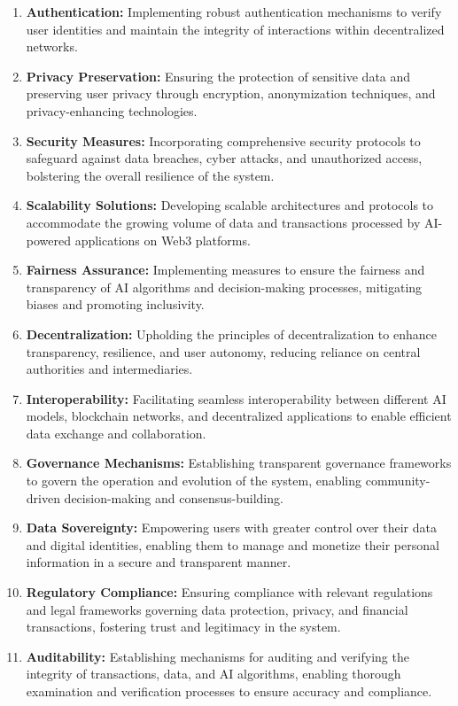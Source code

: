 \documentclass[conference]{IEEEtran}
\begin{document}
\begin{enumerate}
    \item \textbf{Authentication:} Implementing robust authentication mechanisms to verify user identities and maintain the integrity of interactions within decentralized networks.
\item \textbf{Privacy Preservation:} Ensuring the protection of sensitive data and preserving user privacy through encryption, anonymization techniques, and privacy-enhancing technologies.
\item \textbf{Security Measures:} Incorporating comprehensive security protocols to safeguard against data breaches, cyber attacks, and unauthorized access, bolstering the overall resilience of the system.
\item \textbf{Scalability Solutions:} Developing scalable architectures and protocols to accommodate the growing volume of data and transactions processed by AI-powered applications on Web3 platforms.
\item \textbf{Fairness Assurance:} Implementing measures to ensure the fairness and transparency of AI algorithms and decision-making processes, mitigating biases and promoting inclusivity.
\item \textbf{Decentralization:} Upholding the principles of decentralization to enhance transparency, resilience, and user autonomy, reducing reliance on central authorities and intermediaries.
\item \textbf{Interoperability:} Facilitating seamless interoperability between different AI models, blockchain networks, and decentralized applications to enable efficient data exchange and collaboration.
\item \textbf{Governance Mechanisms:} Establishing transparent governance frameworks to govern the operation and evolution of the system, enabling community-driven decision-making and consensus-building.
\item \textbf{Data Sovereignty:} Empowering users with greater control over their data and digital identities, enabling them to manage and monetize their personal information in a secure and transparent manner.
\item \textbf{Regulatory Compliance:} Ensuring compliance with relevant regulations and legal frameworks governing data protection, privacy, and financial transactions, fostering trust and legitimacy in the system.
\item \textbf{Auditability:} Establishing mechanisms for auditing and verifying the integrity of transactions, data, and AI algorithms, enabling thorough examination and verification processes to ensure accuracy and compliance.

\end{enumerate}
\end{document}
